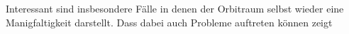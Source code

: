 %
%
%
%
%
Interessant sind insbesondere Fälle in denen der Orbitraum selbst wieder eine
Manigfaltigkeit darstellt. Dass dabei auch Probleme auftreten können zeigt
